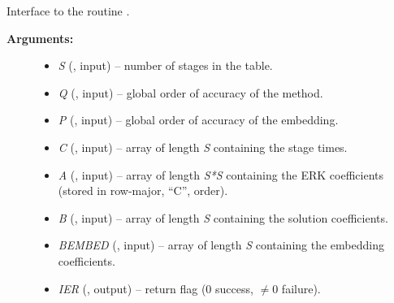 \documentclass[letterpaper,10pt,english]{sphinxmanual}
\begin{document}
\begin{fulllineitems}
\label{f_interface/Usage:f/_/FARKSETERKTABLE}
Interface to the routine {\hyperref[c_interface/User_callable:c.ARKodeSetERKTable]{\emph{}}}.
\begin{description}
\item[{\textbf{Arguments:}}] \leavevmode\begin{itemize}
\item {} 
\emph{S} (, input) -- number of stages in the table.

\item {} 
\emph{Q} (, input) -- global order of accuracy of the method.

\item {} 
\emph{P} (, input) -- global order of accuracy of the embedding.

\item {} 
\emph{C} (, input) -- array of length \emph{S} containing the stage times.

\item {} 
\emph{A} (, input) -- array of length \emph{S*S} containing the ERK coefficients
(stored in row-major, ``C'', order).

\item {} 
\emph{B} (, input) -- array of length \emph{S} containing the solution coefficients.

\item {} 
\emph{BEMBED} (, input) -- array of length \emph{S} containing the embedding
coefficients.

\item {} 
\emph{IER} (, output) -- return flag (0 success, \(\ne 0\) failure).

\end{itemize}

\end{description}

\end{fulllineitems}

\end{document}

